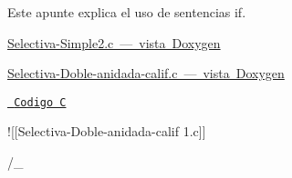 Este apunte explica el uso de sentencias if.


\begin{DoxyItemize}
\item \mbox{\hyperlink{Selectiva-Simple2_8c_sel_simple}{Selectiva-\/\+Simple2.c — vista Doxygen}}
\item \mbox{\hyperlink{Selectiva-Doble-anidada-calif_8c_sel_doble}{Selectiva-\/\+Doble-\/anidada-\/calif.c — vista Doxygen}}
\end{DoxyItemize}

\href{file:///home/franky/Proyects/Trabajos-Universidad-Codigo-UDG/2semPE/c/src/Condicionales/Selectiva-Doble-anidada-calif.c}{\texttt{ Codigo C}}

!\mbox{[}\mbox{[}Selectiva-\/\+Doble-\/anidada-\/calif 1.\+c\mbox{]}\mbox{]}

/\+\_\+ 